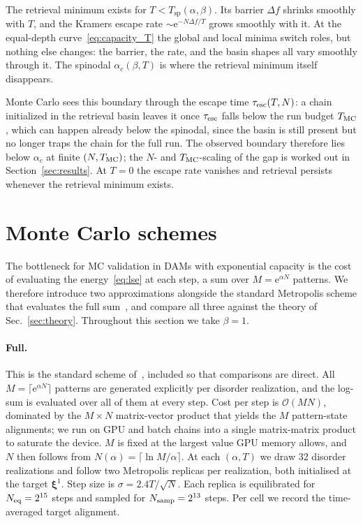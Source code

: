 \documentclass[letterpaper]{article} %
\newcommand{\bxi}{\boldsymbol{\xi}}
\newcommand{\e}{{\mathrm{e}}}
\newcommand{\Bnet}{\beta}
\newcommand{\ac}{\alpha_c}
\begin{document}

The retrieval minimum exists for $T < T_{\mathrm{sp}}(\alpha, \Bnet)$. Its barrier $\Delta f$ shrinks smoothly with $T$, and the Kramers escape rate $\sim \e^{-N \Delta f / T}$ grows smoothly with it. At the equal-depth curve~\eqref{eq:capacity_T} the global and local minima switch roles, but nothing else changes: the barrier, the rate, and the basin shapes all vary smoothly through it. The spinodal $\ac(\Bnet, T)$ is where the retrieval minimum itself disappears.

Monte Carlo sees this boundary through the escape time $\tau_{\rm esc}(T, N)$: a chain initialized in the retrieval basin leaves it once $\tau_{\rm esc}$ falls below the run budget $T_{\rm MC}$, which can happen already below the spinodal, since the basin is still present but no longer traps the chain for the full run. The observed boundary therefore lies below $\ac$ at finite $(N, T_{\rm MC})$; the $N$- and $T_{\rm MC}$-scaling of the gap is worked out in Section~\ref{sec:results}. At $T = 0$ the escape rate vanishes and retrieval persists whenever the retrieval minimum exists.


\section{Monte Carlo schemes}
\label{sec:mc}

The bottleneck for MC validation in DAMs with exponential capacity is the cost of evaluating the energy~\eqref{eq:lse} at each step, a sum over $M = \e^{\alpha N}$ patterns. We therefore introduce two approximations alongside the standard Metropolis scheme that evaluates the full sum~\citep[e.g.,][]{iclr2026mc}, and compare all three against the theory of Sec.~\ref{sec:theory}. Throughout this section we take $\Bnet = 1$.

\paragraph{Full.} This is the standard scheme of~\citet{iclr2026mc}, included so that comparisons are direct. All $M = \lceil\e^{\alpha N}\rceil$ patterns are generated explicitly per disorder realization, and the log-sum is evaluated over all of them at every step. Cost per step is $\mathcal{O}(MN)$, dominated by the $M \times N$ matrix-vector product that yields the $M$ pattern-state alignments; we run on GPU and batch chains into a single matrix-matrix product to saturate the device. $M$ is fixed at the largest value GPU memory allows, and $N$ then follows from $N(\alpha) = \lceil \ln M / \alpha \rceil$. At each $(\alpha, T)$ we draw 32 disorder realizations and follow two Metropolis replicas per realization, both initialised at the target $\bxi^1$. Step size is $\sigma = 2.4 T / \sqrt N$. Each replica is equilibrated for $N_{\rm eq} = 2^{15}$ steps and sampled for $N_{\rm samp} = 2^{13}$ steps. Per cell we record the time-averaged target alignment.
\end{document}
